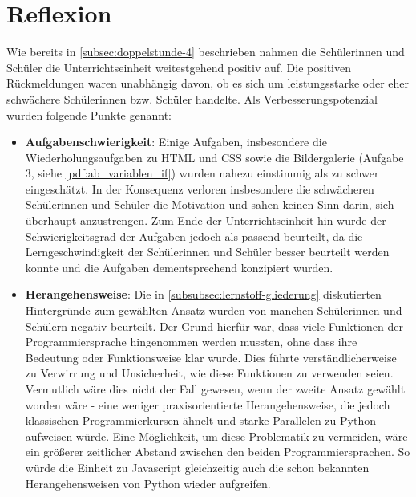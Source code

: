 \section{Reflexion}

Wie bereits in \autoref{subsec:doppelstunde-4} beschrieben nahmen die Schülerinnen und Schüler die Unterrichtseinheit weitestgehend positiv auf.
Die positiven Rückmeldungen waren unabhängig davon, ob es sich um leistungsstarke oder eher schwächere Schülerinnen bzw. Schüler handelte.
Als Verbesserungspotenzial wurden folgende Punkte genannt:

\begin{itemize}
	\item \textbf{Aufgabenschwierigkeit}: Einige Aufgaben, insbesondere die Wiederholungsaufgaben zu HTML und CSS sowie die Bildergalerie (Aufgabe 3, siehe \autoref{pdf:ab_variablen_if}) wurden nahezu einstimmig als zu schwer eingeschätzt.
	In der Konsequenz verloren insbesondere die schwächeren Schülerinnen und Schüler die Motivation und sahen keinen Sinn darin, sich überhaupt anzustrengen.
	Zum Ende der Unterrichtseinheit hin wurde der Schwierigkeitsgrad der Aufgaben jedoch als passend beurteilt, da die Lerngeschwindigkeit der Schülerinnen und Schüler besser beurteilt werden konnte und die Aufgaben dementsprechend konzipiert wurden.

	\item \textbf{Herangehensweise}: Die in \autoref{subsubsec:lernstoff-gliederung} diskutierten Hintergründe zum gewählten Ansatz wurden von manchen Schülerinnen und Schülern negativ beurteilt.
	Der Grund hierfür war, dass viele Funktionen der Programmiersprache hingenommen werden mussten, ohne dass ihre Bedeutung oder Funktionsweise klar wurde.
	Dies führte verständlicherweise zu Verwirrung und Unsicherheit, wie diese Funktionen zu verwenden seien.
	Vermutlich wäre dies nicht der Fall gewesen, wenn der zweite Ansatz gewählt worden wäre - eine weniger praxisorientierte Herangehensweise, die jedoch klassischen Programmierkursen ähnelt und starke Parallelen zu Python aufweisen würde.
	Eine Möglichkeit, um diese Problematik zu vermeiden, wäre ein größerer zeitlicher Abstand zwischen den beiden Programmiersprachen.
	So würde die Einheit zu Javascript gleichzeitig auch die schon bekannten Herangehensweisen von Python wieder aufgreifen.
\end{itemize}

